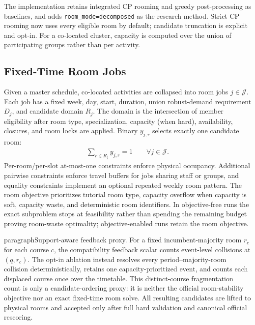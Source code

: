 The implementation retains integrated CP rooming and greedy post-processing as baselines, and adds \texttt{room\_mode=decomposed} as the research method.
Strict CP rooming now uses every eligible room by default; candidate truncation is explicit and opt-in.
For a co-located cluster, capacity is computed over the union of participating groups rather than per activity.

\subsection{Fixed-Time Room Jobs}
Given a master schedule, co-located activities are collapsed into room jobs $j\in\mathcal{J}$.
Each job has a fixed week, day, start, duration, union robust-demand requirement $D_j$, and candidate domain $R_j$.
The domain is the intersection of member eligibility after room type, specialization, capacity (when hard), availability, closures, and room locks are applied.
Binary $y_{j,r}$ selects exactly one candidate room:
\begin{align}
\sum_{r\in R_j}y_{j,r}=1 \qquad \forall j\in\mathcal{J}.
\end{align}
Per-room/per-slot at-most-one constraints enforce physical occupancy.
Additional pairwise constraints enforce travel buffers for jobs sharing staff or groups, and equality constraints implement an optional repeated weekly room pattern.
The room objective prioritizes tutorial room type, capacity overflow when capacity is soft, capacity waste, and deterministic room identifiers.
In objective-free runs the exact subproblem stops at feasibility rather than spending the remaining budget proving room-waste optimality; objective-enabled runs retain the room objective.

paragraph{Support-aware feedback proxy.}
For a fixed incumbent-majority room $r_c$ for each course $c$, the compatibility feedback scalar counts event-level collisions at $(q,r_c)$.
The opt-in ablation instead resolves every period--majority-room collision deterministically, retains one capacity-prioritized event, and counts each displaced course once over the timetable.
This distinct-course fragmentation count is only a candidate-ordering proxy: it is neither the official room-stability objective nor an exact fixed-time room solve.
All resulting candidates are lifted to physical rooms and accepted only after full hard validation and canonical official rescoring.

